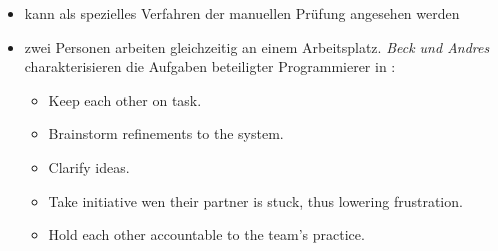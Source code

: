 \begin{itemize}
\begin{itemize}
        \item kann als spezielles Verfahren der manuellen Prüfung angesehen werden
        \item zwei Personen arbeiten gleichzeitig an einem Arbeitsplatz.
        \textit{Beck und Andres} charakterisieren die Aufgaben beteiligter Programmierer in \cite[42]{BA04}:
        \begin{itemize}
            \item Keep each other on task.
            \item Brainstorm refinements to the system.
            \item Clarify ideas.
            \item Take initiative wen their partner is stuck, thus lowering frustration.
            \item Hold each other accountable to the team's practice.
        \end{itemize}
    \end{itemize}
\end{itemize}
